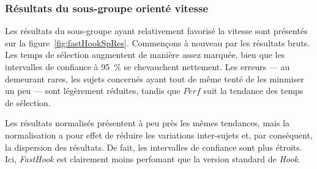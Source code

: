 	\subsubsection{Résultats du sous-groupe orienté vitesse}
	Les résultats du sous-groupe ayant relativement favorisé la vitesse sont présentés sur la figure~\ref{fig:fastHookSpRes}. Commençons à nouveau par les résultats bruts. Les temps de sélection augmentent de manière assez marquée, bien que les intervalles de confiance à 95~\%{} se chevauchent nettement. Les erreurs --- au demeurant rares, les sujets concernés ayant tout de même tenté de les minmiser un peu --- sont légèrement réduites, tandis que $Perf$ suit la tendance des temps de sélection.
	
	Les résultats normalisés présentent à peu près les mêmes tendances, mais la normalisation a pour effet de réduire les variations inter-sujets et, par conséquent, la dispersion des résultats. De fait, les intervalles de confiance sont plus étroits. Ici, \emph{FastHook} est clairement moins perfomant que la version standard de \emph{Hook}.

